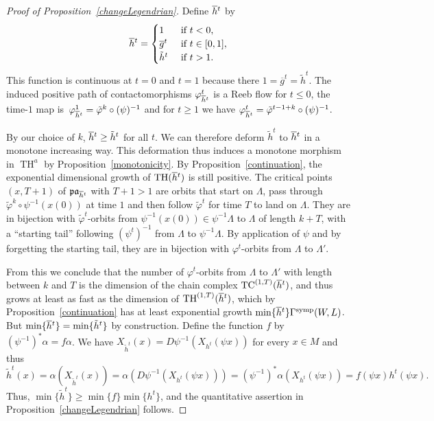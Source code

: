\documentclass{amsart}
\newcommand{\pacal}{\mathfrak{pa}}
\renewcommand{\TH}{\operatorname{TH}}
\newcommand{\TC}{\operatorname{TC}}
\theoremstyle{definition}
\theoremstyle{remark}
\numberwithin{equation}{section}
\begin{document}
\begin{proof}[Proof of Proposition~\ref{changeLegendrian}]
Define $\overline h\vphantom{h}^t$ by
	\begin{equation*}
	\overline h\vphantom{h}^t=\begin{cases}
		1 &\mbox{ if }t<0,\\
		\overline g^t &\mbox{ if }t\in[0,1],\\
		\tilde h^t &\mbox{ if }t>1.
	\end{cases}
	\end{equation*}
This function is continuous at $t=0$ and $t=1$ because there $1=\overline g^t=\tilde h^t$. The induced positive path of contactomorphisms $\varphi^t_{\overline h\vphantom{h}^t}$ is a Reeb flow for $t\leq 0$, the time-$1$ map is~$\varphi_{\overline h\vphantom{h}^t}^1=\tilde\varphi^k\circ (\psi)^{-1}$ and for $t\geq 1$ we have $\varphi_{\overline h\vphantom{h}^t}^t=\tilde\varphi^{t-1+k}\circ (\psi)^{-1}$.

By our choice of $k$, $\overline h\vphantom{h}^t\geq\tilde h^t$ for all $t$. We can therefore deform $\tilde h^t$ to $\overline h\vphantom{h}^t$ in a monotone increasing way. This deformation thus induces a monotone morphism in $\TH^a$ by Proposition~\ref{monotonicity}. By Proposition~\ref{continuation}, the exponential dimensional growth of $\TH(\overline h\vphantom{h}^t)$ is still positive. The critical points $(x,T+1)$ of $\pacal_{\overline h\vphantom{h}^t}$ with $T+1>1$ are orbits that start on $\Lambda$, pass through $\tilde\varphi^k\circ\psi^{-1}(x(0))$ at time $1$ and then follow $\tilde\varphi^t$ for time $T$ to land on $\Lambda$. They are in bijection with $\tilde\varphi^t$-orbits from $\psi^{-1}(x(0))\in\psi^{-1}\Lambda$ to $\Lambda$ of length $k+T$, with a ``starting tail'' following $(\psi^t)^{-1}$ from $\Lambda$ to $\psi^{-1}\Lambda$. By application of $\psi$ and by forgetting the starting tail, they are in bijection with $\varphi^t$-orbits from $\Lambda$ to $\Lambda'$.

From this we conclude that the number of $\varphi^t$-orbits from $\Lambda$ to $\Lambda'$ with length between $k$ and $T$ is the dimension of the chain complex $\TC^{(1,T)}(\overline h\vphantom{h}^t)$, and thus grows at least as fast as the dimension of $\TH^{(1,T)}(\overline h\vphantom{h}^t)$, which by Proposition~\ref{continuation} has at least exponential growth $\min\{\overline h\vphantom{h}^t\}\Gamma^{\rm symp}(W,L)$. But $\min\{\overline h\vphantom{h}^t\}=\min\{\tilde h^t\}$ by construction. Define the function $f$ by $(\psi^{-1})^*\alpha=f\alpha$. We have $X_{\tilde h^t}(x)=D\psi^{-1}(X_{h^t}(\psi x))$ for every $x\in M$ and thus
\begin{equation*}
	\tilde h^t(x)=\alpha(X_{\tilde h^t}(x))=\alpha(D\psi^{-1}(X_{h^t}(\psi x)))=(\psi^{-1})^*\alpha(X_{h^t}(\psi x))=f(\psi x)h^t(\psi x).
\end{equation*}
Thus, $\min\{\tilde h^t\}\geq \min \{f\}\min \{h^t\}$, and the quantitative assertion in Proposition~\ref{changeLegendrian} follows.
\end{proof}
\end{document}
